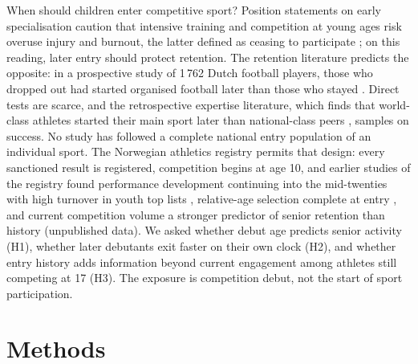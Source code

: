 \documentclass[12pt,a4paper]{article}
\begin{document}
When should children enter competitive sport? Position statements on early specialisation caution that intensive training and competition at young ages risk overuse injury and burnout, the latter defined as ceasing to participate \cite{difiori2014}; on this reading, later entry should protect retention. The retention literature predicts the opposite: in a prospective study of 1\,762 Dutch football players, those who dropped out had started organised football later than those who stayed \cite{vanyperen2021}. Direct tests are scarce, and the retrospective expertise literature, which finds that world-class athletes started their main sport later than national-class peers \cite{barth2022,gullich2025}, samples on success. No study has followed a complete national entry population of an individual sport. The Norwegian athletics registry permits that design: every sanctioned result is registered, competition begins at age 10, and earlier studies of the registry found performance development continuing into the mid-twenties with high turnover in youth top lists \cite{guttormsen2026development}, relative-age selection complete at entry \cite{guttormsen2026rae}, and current competition volume a stronger predictor of senior retention than history (unpublished data). We asked whether debut age predicts senior activity (H1), whether later debutants exit faster on their own clock (H2), and whether entry history adds information beyond current engagement among athletes still competing at 17 (H3). The exposure is competition debut, not the start of sport participation.

\section{Methods}
\end{document}
